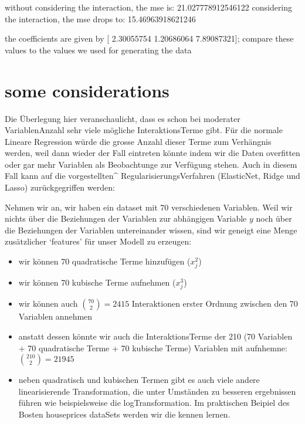 \documentclass[letterpaper,10pt,english]{jupyterBook}
\begin{document}
\begin{sphinxVerbatim}[commandchars=\\\{\}]
without considering the interaction, the mse is: 21.027778912546122
considering the interaction, the mse drops to: 15.46963918621246

the coefficients are given by [ 2.30055754 \PYGZhy{}1.20686064 \PYGZhy{}7.89087321]; compare these values
 to the values we used for generating the data
\end{sphinxVerbatim}


\section{some considerations}
\label{\detokenize{Regression_Techniques:some-considerations}}
\sphinxAtStartPar
Die Überlegung hier veranschaulicht, dass es schon bei moderater Variablen\sphinxhyphen{}Anzahl sehr viele mögliche Interaktions\sphinxhyphen{}Terme gibt. Für die normale Lineare Regression würde die grosse Anzahl dieser Terme zum Verhängnis werden, weil dann wieder der Fall eintreten könnte indem wir die Daten overfitten oder gar mehr Variablen als Beobachtunge zur Verfügung stehen. Auch in diesem Fall kann auf die vorgestellten\textasciicircum{} Regularisierungs\sphinxhyphen{}Verfahren (ElasticNet, Ridge und Lasso) zurückgegriffen werden:

\sphinxAtStartPar
Nehmen wir an, wir haben ein data\sphinxhyphen{}set mit 70 verschiedenen Variablen. Weil wir nichts über die Beziehungen der Variablen zur abhängigen Variable \(y\) noch über die Beziehungen der Variablen untereinander wissen, sind wir geneigt eine Menge zusätzlicher ‘features’ für unser Modell zu erzeugen:
\begin{itemize}
\item {} 
\sphinxAtStartPar
wir können 70 quadratische Terme hinzufügen (\(x_j^2\))

\item {} 
\sphinxAtStartPar
wir können 70 kubische Terme aufnehmen (\(x_j^3\))

\item {} 
\sphinxAtStartPar
wir können auch \(\binom{70}{2} = 2415\) Interaktionen erster Ordnung zwischen den 70 Variablen annehmen

\item {} 
\sphinxAtStartPar
anstatt dessen könnte wir auch die Interaktions\sphinxhyphen{}Terme der 210 (70 Variablen + 70 quadratische Terme + 70 kubische Terme) Variablen mit aufnhemne: \(\binom{210}{2} = 21945\)

\item {} 
\sphinxAtStartPar
neben quadratisch und kubischen Termen gibt es auch viele andere linearisierende Transformation, die unter Umständen zu besseren ergebnissen führen wie beispielsweise die log\sphinxhyphen{}Transformation. Im praktischen Beipiel des Bosten house\sphinxhyphen{}prices data\sphinxhyphen{}Sets werden wir die  kennen lernen.

\end{itemize}
\end{document}
